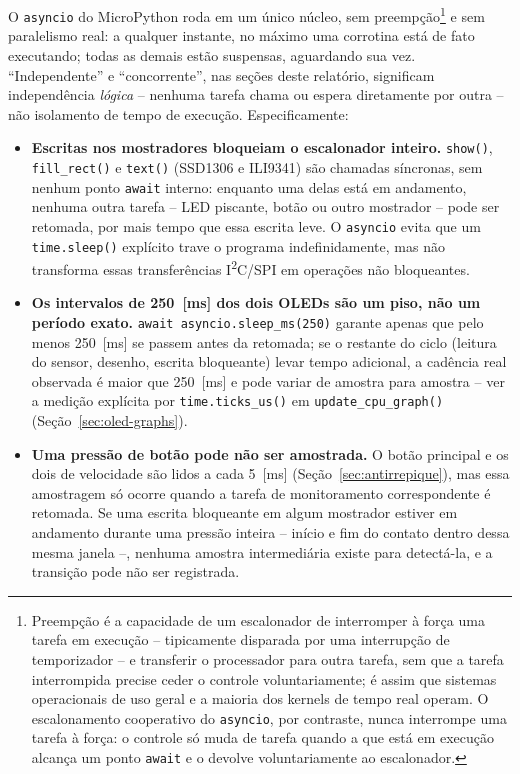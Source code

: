 \documentclass[12pt,a4paper]{article}
\begin{document}
O \texttt{asyncio} do MicroPython roda em um único núcleo, sem preempção\footnote{Preempção é a capacidade de um escalonador de interromper à força uma tarefa em execução -- tipicamente disparada por uma interrupção de temporizador -- e transferir o processador para outra tarefa, sem que a tarefa interrompida precise ceder o controle voluntariamente; é assim que sistemas operacionais de uso geral e a maioria dos kernels de tempo real operam. O escalonamento cooperativo do \texttt{asyncio}, por contraste, nunca interrompe uma tarefa à força: o controle só muda de tarefa quando a que está em execução alcança um ponto \texttt{await} e o devolve voluntariamente ao escalonador.} e sem paralelismo real: a qualquer instante, no máximo uma corrotina está de fato executando; todas as demais estão suspensas, aguardando sua vez. \enquote{Independente} e \enquote{concorrente}, nas seções deste relatório, significam independência \emph{lógica} -- nenhuma tarefa chama ou espera diretamente por outra -- não isolamento de tempo de execução. Especificamente:

\begin{itemize}
  \item \textbf{Escritas nos mostradores bloqueiam o escalonador inteiro.} \texttt{show()}, \texttt{fill\_rect()} e \texttt{text()} (SSD1306 e ILI9341) são chamadas síncronas, sem nenhum ponto \texttt{await} interno: enquanto uma delas está em andamento, nenhuma outra tarefa -- LED piscante, botão ou outro mostrador -- pode ser retomada, por mais tempo que essa escrita leve. O \texttt{asyncio} evita que um \texttt{time.sleep()} explícito trave o programa indefinidamente, mas não transforma essas transferências I\textsuperscript{2}C/SPI em operações não bloqueantes.
  \item \textbf{Os intervalos de 250~[ms] dos dois OLEDs são um piso, não um período exato.} \texttt{await asyncio.sleep\_ms(250)} garante apenas que pelo menos 250~[ms] se passem antes da retomada; se o restante do ciclo (leitura do sensor, desenho, escrita bloqueante) levar tempo adicional, a cadência real observada é maior que 250~[ms] e pode variar de amostra para amostra -- ver a medição explícita por \texttt{time.ticks\_us()} em \texttt{update\_cpu\_graph()} (Seção~\ref{sec:oled-graphs}).
  \item \textbf{Uma pressão de botão pode não ser amostrada.} O botão principal e os dois de velocidade são lidos a cada 5~[ms] (Seção~\ref{sec:antirrepique}), mas essa amostragem só ocorre quando a tarefa de monitoramento correspondente é retomada. Se uma escrita bloqueante em algum mostrador estiver em andamento durante uma pressão inteira -- início e fim do contato dentro dessa mesma janela --, nenhuma amostra intermediária existe para detectá-la, e a transição pode não ser registrada.
\end{itemize}
\end{document}
